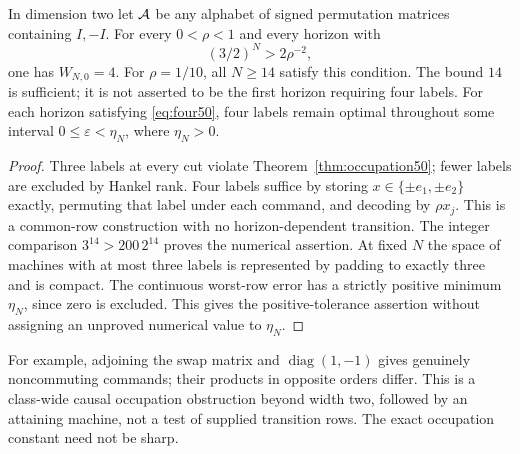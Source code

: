 \begin{corollary}\label{cor:four50}
In dimension two let $\mathcal A$ be any alphabet of signed permutation
matrices containing $I,-I$. For every $0<\rho<1$ and every horizon with
\begin{equation}\label{eq:four50}
 (3/2)^N>2\rho^{-2},
\end{equation}
one has $W_{N,0}=4$. For $\rho=1/10$, all $N\ge14$ satisfy this
condition. The bound $14$ is sufficient; it is not asserted to be the
first horizon requiring four labels. For each horizon satisfying
\eqref{eq:four50}, four labels remain optimal throughout some interval
$0\le\varepsilon<\eta_N$, where $\eta_N>0$.
\end{corollary}
\begin{proof}
Three labels at every cut violate Theorem~\ref{thm:occupation50}; fewer
labels are excluded by Hankel rank. Four labels suffice by storing
$x\in\{\pm e_1,\pm e_2\}$ exactly, permuting that label under each
command, and decoding by $\rho x_j$. This is a common-row construction
with no horizon-dependent transition. The integer comparison
$3^{14}>200\,2^{14}$ proves the numerical assertion. At fixed $N$ the
space of machines with at most three labels is represented by padding
to exactly three and is compact. The continuous worst-row error has a
strictly positive minimum $\eta_N$, since zero is excluded. This gives
the positive-tolerance assertion without assigning an unproved
numerical value to $\eta_N$.
\end{proof}

For example, adjoining the swap matrix and
$\operatorname{diag}(1,-1)$ gives genuinely noncommuting commands; their
products in opposite orders differ. This is a class-wide causal
occupation obstruction beyond width two, followed by an attaining
machine, not a test of supplied transition rows. The exact occupation
constant need not be sharp.


